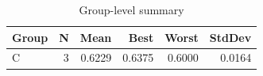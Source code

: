 \begin{table}[htbp]
\centering
\caption{Group-level summary}
\label{tab:group-summary}
\begin{tabular}{lrrrrr}
\toprule
\textbf{Group} & \textbf{N} & \textbf{Mean} & \textbf{Best} & \textbf{Worst} & \textbf{StdDev} \\
\midrule
C & 3 & 0.6229 & 0.6375 & 0.6000 & 0.0164 \\
\bottomrule
\end{tabular}
\end{table}